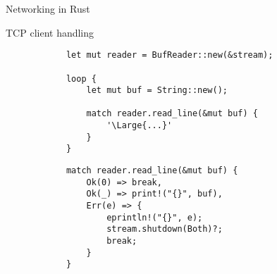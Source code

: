\begin{frame}[fragile]{Networking in Rust}
    \begin{block}{TCP client handling}
        \begin{overprint}
            \begin{verbatim}
            let mut reader = BufReader::new(&stream);
            
            loop {
                let mut buf = String::new();
            
                match reader.read_line(&mut buf) {
                    '\Large{...}'
                }
            }
            \end{verbatim}

            \begin{verbatim}
            match reader.read_line(&mut buf) {
                Ok(0) => break,
                Ok(_) => print!("{}", buf),
                Err(e) => {
                    eprintln!("{}", e);
                    stream.shutdown(Both)?;
                    break;
                }
            }
            \end{verbatim}
        \end{overprint}
    \end{block}
\end{frame}
